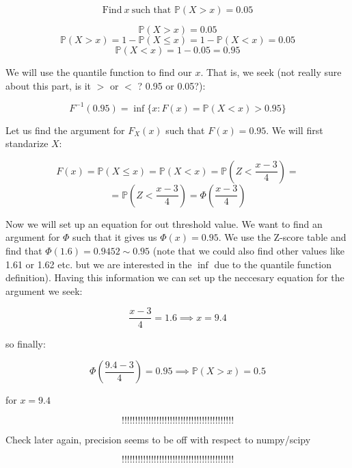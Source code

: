 \documentclass{article}
\begin{document}
\begin{equation*}
    \mbox{Find}  \ x  \ \mbox{such that } \mathds{P}(X > x) = 0.05
\end{equation*}

\begin{equation*}
    \mathds{P}(X > x) = 0.05
\end{equation*}
\begin{equation*}
    \mathds{P}(X > x) = 1 - \mathds{P}(X \leq x) = 1 - \mathds{P}(X < x) = 0.05
\end{equation*}
\begin{equation*}
    \mathds{P}(X < x) = 1 - 0.05 = 0.95
\end{equation*}

We will use the quantile function to find our \(x\). That is, we seek 
(not really sure about this part, is it \(>\) or \(<\) ? 0.95 or 0.05?):

\begin{equation*}
    F^{-1}(0.95) = \inf \{x : F(x) = \mathds{P}(X < x) > 0.95\}
\end{equation*}

Let us find the argument for \(F_{X}(x)\) such that \(F(x) = 0.95\). We will first standarize \(X\):

\begin{equation*}
    F(x) = \mathds{P}(X \leq x) =  \mathds{P}(X < x) = \mathds{P}(Z < \frac{x - 3}{4}) =
\end{equation*}
\begin{equation*}
    = \mathds{P}(Z < \frac{x - 3}{4}) =  \Phi(\frac{x - 3}{4})
\end{equation*}

Now we will set up an equation for out threshold value. We want to find an argument for \(\Phi\) such that it gives us
\(\Phi(x) = 0.95\). We use the Z-score table and find that \(\Phi(1.6) = 0.9452 \sim 0.95\) (note that we could also find other values
like 1.61 or 1.62 etc. but we are interested in the \(\inf\) due to the quantile function definition). Having this information
we can set up the neccesary equation for the argument we seek:

\begin{equation*}
    \frac{x - 3}{4} = 1.6 \implies x = 9.4
\end{equation*}

so finally:

\begin{equation*}
    \Phi(\frac{9.4 - 3}{4}) = 0.95 \implies \mathds{P}(X > x) = 0.5
\end{equation*}

for \(x = 9.4\)

\begin{equation*}
    !!!!!!!!!!!!!!!!!!!!!!!!!!!!!!!!!!!!!!!!!!
\end{equation*}
\begin{center}
    Check later again, precision seems to be off with respect to numpy/scipy
\end{center}
\begin{equation*}
    !!!!!!!!!!!!!!!!!!!!!!!!!!!!!!!!!!!!!!!!!!
\end{equation*}
\end{document}
